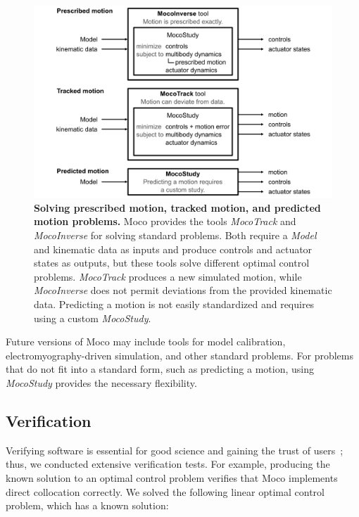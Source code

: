 \documentclass[10pt,letterpaper]{article}
\begin{document}
\begin{figure}[!h]
    \centering
    \includegraphics{../figures/MocoToolDiagram.png}
    \caption{{\bf Solving prescribed motion, tracked motion, and predicted motion problems.}
Moco provides the tools \textit{MocoTrack} and \textit{MocoInverse} for solving standard problems. Both require a \textit{Model} and kinematic data as inputs and produce controls and actuator states as outputs, but these tools solve different optimal control problems. \textit{MocoTrack} produces a new simulated motion, while \textit{MocoInverse} does not permit deviations from the provided kinematic data. Predicting a motion is not easily standardized and requires using a custom \textit{MocoStudy}.    }
    \label{mocotooldiagram}
\end{figure}

Future versions of Moco may include tools for model calibration, electromyography-driven simulation, and other standard problems. For problems that do not fit into a standard form, such as predicting a motion, using \textit{MocoStudy} provides the necessary flexibility.

\subsection*{Verification}

Verifying software is essential for good science and gaining the trust of users~\cite{Hicks:2015bo}; thus, we conducted extensive verification tests. For example, producing the known solution to an optimal control problem verifies that Moco implements direct collocation correctly. We solved the following linear optimal control problem, which has a known solution:
\end{document}
